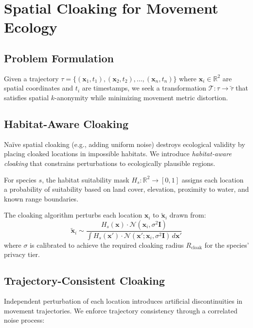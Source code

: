 \section{Spatial Cloaking for Movement Ecology}


\subsection{Problem Formulation}

Given a trajectory $\tau = \{(\mathbf{x}_1, t_1), (\mathbf{x}_2, t_2), \ldots, (\mathbf{x}_n, t_n)\}$ where $\mathbf{x}_i \in \mathbb{R}^2$ are spatial coordinates and $t_i$ are timestamps, we seek a transformation $\mathcal{T}: \tau \to \tilde{\tau}$ that satisfies spatial $k$-anonymity while minimizing movement metric distortion.

\subsection{Habitat-Aware Cloaking}

Na\"ive spatial cloaking (e.g., adding uniform noise) destroys ecological validity by placing cloaked locations in impossible habitats. We introduce \emph{habitat-aware cloaking} that constrains perturbations to ecologically plausible regions.

\begin{definition}
For species $s$, the habitat suitability mask $H_s: \mathbb{R}^2 \to [0, 1]$ assigns each location a probability of suitability based on land cover, elevation, proximity to water, and known range boundaries.
\end{definition}

The cloaking algorithm perturbs each location $\mathbf{x}_i$ to $\tilde{\mathbf{x}}_i$ drawn from:
\begin{equation}
\tilde{\mathbf{x}}_i \sim \frac{H_s(\mathbf{x}) \cdot \mathcal{N}(\mathbf{x}_i, \sigma^2 \mathbf{I})}{\int H_s(\mathbf{x}') \cdot \mathcal{N}(\mathbf{x}'; \mathbf{x}_i, \sigma^2 \mathbf{I}) \, d\mathbf{x}'}
\end{equation}
where $\sigma$ is calibrated to achieve the required cloaking radius $R_{\text{cloak}}$ for the species' privacy tier.

\subsection{Trajectory-Consistent Cloaking}

Independent perturbation of each location introduces artificial discontinuities in movement trajectories. We enforce trajectory consistency through a correlated noise process:

